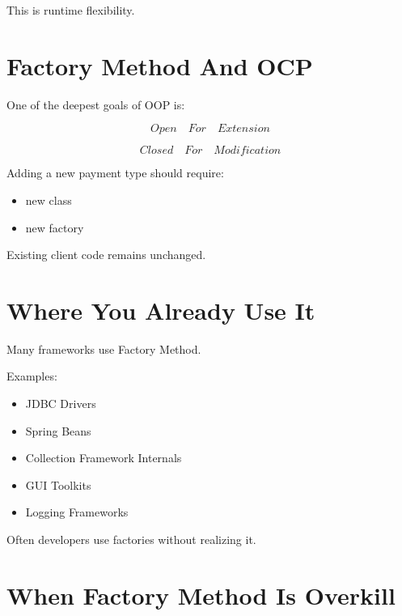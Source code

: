 \documentclass[11pt,a4paper]{book}
\begin{document}
This is runtime flexibility.


\section{Factory Method And OCP}

\begin{idea}

One of the deepest goals of OOP is:

\[
Open
\quad
For
\quad
Extension
\]

\[
Closed
\quad
For
\quad
Modification
\]

\end{idea}

Adding a new payment type should require:

\begin{itemize}

\item new class
\item new factory

\end{itemize}

Existing client code remains unchanged.


\section{Where You Already Use It}

Many frameworks use Factory Method.

Examples:

\begin{itemize}

\item JDBC Drivers
\item Spring Beans
\item Collection Framework Internals
\item GUI Toolkits
\item Logging Frameworks

\end{itemize}

Often developers use factories without realizing it.


\section{When Factory Method Is Overkill}
\end{document}
